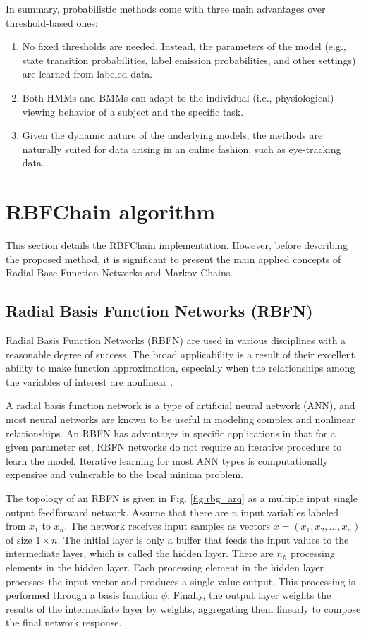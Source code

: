 \documentclass[preprint,12pt]{elsarticle}
\begin{document}
In summary, probabilistic methods come with three main advantages over threshold-based ones:

\begin{enumerate}
    \item No fixed thresholds are needed. Instead, the parameters of the model (e.g., state transition probabilities, label emission probabilities, and other settings) are learned from labeled data.
    \item Both HMMs and BMMs can adapt to the individual (i.e., physiological) viewing behavior of a subject and the specific task.
    \item Given the dynamic nature of the underlying models, the methods are naturally suited for data arising in an online fashion, such as eye-tracking data.
\end{enumerate}

\section{RBFChain algorithm}
\label{sec:rbfchain_algorithm}

This section details the RBFChain implementation. However, before describing the proposed method, it is significant to present the main applied concepts of Radial Base Function Networks and Markov Chains.

\subsection{Radial Basis Function Networks (RBFN)}

Radial Basis Function Networks (RBFN) are used in various disciplines with a reasonable degree of success. The broad applicability is a result of their excellent ability to make function approximation, especially when the relationships among the variables of interest are nonlinear \cite{Bishop:2006:PRM:1162264}.

A radial basis function network is a type of artificial neural network (ANN), and most neural networks are known to be useful in modeling complex and nonlinear relationships. An RBFN has advantages in specific applications in that for a given parameter set, RBFN networks do not require an iterative procedure to learn the model. Iterative learning for most ANN types is computationally expensive and vulnerable to the local minima problem.

The topology of an RBFN is given in Fig. \ref{fig:rbg_arq} as a multiple input single output feedforward network.
Assume that there are $n$ input variables labeled from $x_1$ to $x_n$.
The network receives input samples as vectors $x=(x_1, x_2, \ldots, x_n)$ of size $1 \times n$.
The initial layer is only a buffer that feeds the input values to the intermediate layer, which is called the hidden layer.
There are $n_h$ processing elements in the hidden layer.
Each processing element in the hidden layer processes the input vector and produces a single value output. This processing is performed through a basis function $\phi$.
Finally, the output layer weights the results of the intermediate layer by weights, aggregating them linearly to compose the final network response.
\end{document}
